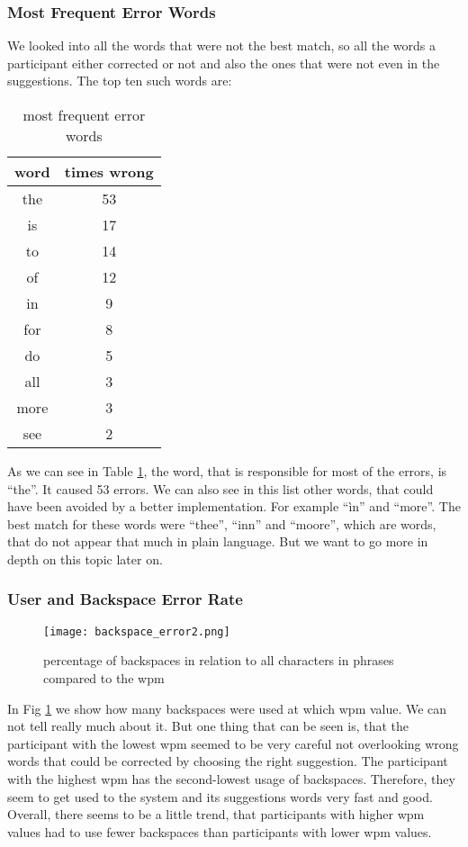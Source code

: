 \subsubsection{Most Frequent Error Words}
We looked into all the words that were not the best match, so all the words a participant either corrected or not and also the ones that were not even in the suggestions. The top ten such words are:
\begin{table}[H]
    \centering
    \caption{most frequent error words}
    \begin{tabular}{cc} \toprule
        word&times wrong\\ \midrule
        the & 53\\
        is & 17\\
        to & 14\\
        of & 12\\
        in & 9\\
        for & 8\\
        do & 5\\
        all & 3\\
        more & 3\\
        see & 2\\
        \bottomrule
    \end{tabular}
    \label{tab:error_words}
\end{table}

As we can see in Table \ref{tab:error_words}, the word, that is responsible for most of the errors, is ``the''. It caused 53 errors. We can also see in this list other words, that could have been avoided by a better implementation. For example ``ìn'' and ``more''.
The best match for these words were ``thee'', ``inn'' and ``moore'', which are words, that do not appear that much in plain language. But we want to go more in depth on this topic later on.

\subsubsection{User and Backspace Error Rate}
\begin{figure}[H]
    \centering
    \texttt{[image: backspace\_error2.png]}
    \caption{percentage of backspaces in relation to all characters in phrases compared to the wpm}
    \label{fig:error_backspace}
\end{figure}

In Fig \ref{fig:error_backspace} we show how many backspaces were used at which wpm value. We can not tell really much about it. But one thing that can be seen is, that the participant with the lowest wpm seemed to be very careful not overlooking wrong words that could be corrected by choosing the right suggestion. The participant with the highest wpm has the second-lowest usage of backspaces. Therefore, they seem to get used to the system and its suggestions words very fast and good.\\
Overall, there seems to be a little trend, that participants with higher wpm values had to use fewer backspaces than participants with lower wpm values.

